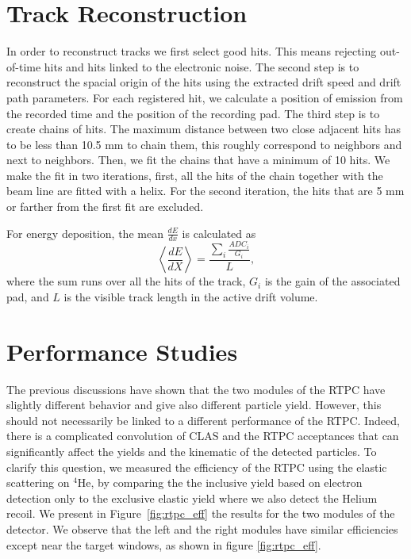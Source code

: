 \documentclass[twocolumn,showpacs,superscriptaddress,groupedaddress]{revtex4}
\begin{document}
\section{Track Reconstruction}\label{sec_rec}
In order to reconstruct tracks we first select good hits. This means rejecting 
out-of-time hits and hits linked to the electronic noise. The second step is 
to reconstruct the spacial origin of the hits using the extracted drift speed and drift path 
parameters. For each registered hit, we calculate a position of emission from 
the recorded time and the position of the recording pad. The third step 
is to create chains of hits. The maximum distance between two close adjacent 
hits has to be less than 10.5 mm to chain them, this roughly correspond to 
neighbors and next to neighbors. Then, we fit the chains that have a minimum of 
10 hits. We make the fit in two iterations, first, all the hits of the chain 
together with the beam line are fitted with a helix. For the second iteration, 
the hits that are 5 mm or farther from the first fit are excluded.

For energy deposition, the mean $\frac{dE}{dx}$ is calculated as
\begin{equation}
 \left\langle \frac{dE}{dX} \right\rangle= \frac{\sum\limits_{i} \frac{ADC_{i}}{G_i}}{L},
\end{equation}
where the sum runs over all the hits of the track, $G_{i}$ is the gain of 
the associated pad, and $L$ is the visible track length in the active drift 
volume. 

\section{Performance Studies}\label{sec_perfor}

The previous discussions have shown that the two modules of the RTPC have 
slightly different behavior and give also different particle yield. However, 
this should not necessarily be linked to a different performance of the RTPC. 
Indeed, there is a complicated convolution of CLAS and the RTPC acceptances 
that can significantly affect the yields and the kinematic of the detected 
particles. To clarify this question, we measured the 
efficiency of the RTPC using the elastic scattering on $^4$He, by comparing the 
 the inclusive yield based on electron detection only to the exclusive elastic 
yield where we also detect the Helium recoil. We present in 
Figure~\ref{fig:rtpc_eff} the results for the two modules 
of the detector. We observe that the left and 
the right modules have similar efficiencies except near the target windows, as 
shown in figure \ref{fig:rtpc_eff}.
\end{document}
